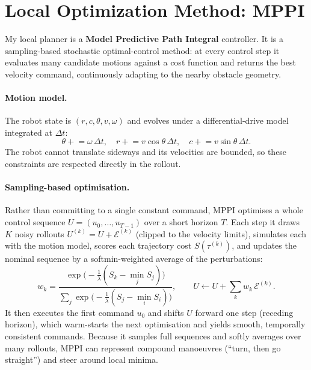 \section{Local Optimization Method: MPPI}
\label{sec:local}

My local planner is a \textbf{Model Predictive Path Integral} controller. It is a sampling-based stochastic
optimal-control method: at every control step it evaluates many candidate motions against
a cost function and returns the best velocity command, continuously adapting to the nearby
obstacle geometry.

\paragraph{Motion model.} The robot state is $(r,c,\theta,v,\omega)$ and evolves under a
differential-drive model integrated at $\Delta t$:
\begin{equation}
    \theta \mathrel{+}= \omega\,\Delta t,\quad
    r \mathrel{+}= v\cos\theta\,\Delta t,\quad
    c \mathrel{+}= v\sin\theta\,\Delta t .
\end{equation}
The robot cannot translate sideways and its velocities are bounded, so these constraints
are respected directly in the rollout.

\paragraph{Sampling-based optimisation.} Rather than committing to a single constant
command, MPPI optimises a whole control sequence $U=(u_0,\dots,u_{T-1})$ over a short
horizon $T$. Each step it draws $K$ noisy rollouts $U^{(k)}=U+\mathcal{E}^{(k)}$ (clipped to
the velocity limits), simulates each with the motion model, scores each trajectory cost
$S(\tau^{(k)})$, and updates the nominal sequence by a softmin-weighted average of the
perturbations:
\begin{equation}
    w_k = \frac{\exp\!\big(-\tfrac1\lambda(S_k-\min_j S_j)\big)}{\sum_j \exp\!\big(-\tfrac1\lambda(S_j-\min_i S_i)\big)},
    \qquad U \leftarrow U + \sum_k w_k\,\mathcal{E}^{(k)} .
\end{equation}
It then executes the first command $u_0$ and shifts $U$ forward one step (receding horizon),
which warm-starts the next optimisation and yields smooth, temporally consistent commands.
Because it samples full sequences and softly averages over many rollouts, MPPI can represent
compound manoeuvres (``turn, then go straight'') and steer around local minima.

